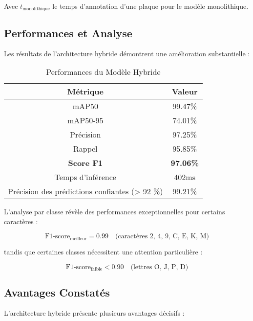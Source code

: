 \documentclass[letterpaper, 10 pt, conference]{ieeeconf}  %
\begin{document}
Avec $t_{\text{monolithique}}$ le temps d'annotation d'une plaque
pour le modèle monolithique.

\subsection{Performances et Analyse}

Les résultats de l'architecture hybride démontrent une amélioration substantielle :

\begin{table}[h]
\caption{Performances du Modèle Hybride}
\label{table_hybride}
\begin{center}
\begin{tabular}{|c|c|}
\hline
\textbf{Métrique} & \textbf{Valeur} \\
\hline
mAP50 & 99.47\% \\
\hline
mAP50-95 & 74.01\% \\
\hline
Précision & 97.25\% \\
\hline
Rappel & 95.85\% \\
\hline
\textbf{Score F1} & \textbf{97.06\%} \\
\hline
Temps d'inférence & 402ms \\
\hline
Précision des prédictions confiantes (> 92 \%) & 99.21\% \\
\hline
\end{tabular}
\end{center}
\end{table}

L'analyse par classe révèle des performances exceptionnelles pour certains caractères :

\begin{equation}
\text{F1-score}_{\text{meilleur}} = 0.99 \quad \text{(caractères 2, 4, 9, C, E, K, M)}
\end{equation}

tandis que certaines classes nécessitent une attention particulière :

\begin{equation}
\text{F1-score}_{\text{faible}} < 0.90 \quad \text{(lettres O, J, P, D)}
\end{equation}

\subsection{Avantages Constatés}

L'architecture hybride présente plusieurs avantages décisifs :
\end{document}
